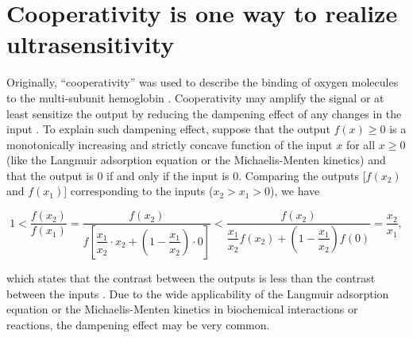 
\section{Cooperativity is one way to realize ultrasensitivity}

Originally, ``cooperativity'' was used to describe the binding of oxygen molecules to the multi-subunit hemoglobin \cite{KNF, MWC}. Cooperativity may amplify the signal or at least sensitize the output by reducing the dampening effect of any changes in the input \cite{CooperativityQA}. To explain such dampening effect, suppose that the output $f(x) \geq 0$ is a monotonically increasing and strictly concave function of the input $x$ for all $x \geq 0$ (like the Langmuir adsorption equation or the Michaelis-Menten kinetics) and that the output is 0 if and only if the input is 0. Comparing the outputs [$f(x_2)$ and $f(x_1)$] corresponding to the inputs ($x_2 > x_1 > 0$), we have

\begin{equation*}
    1 < \dfrac{f(x_2)}{f(x_1)} = \dfrac{f(x_2)}{f[\dfrac{x_1}{x_2} \cdot x_2 + (1-\dfrac{x_1}{x_2}) \cdot 0]} < \dfrac{f(x_2)}{\dfrac{x_1}{x_2}f(x_2) + (1-\dfrac{x_1}{x_2})f(0)} = \dfrac{x_2}{x_1},
\end{equation*}

\noindent which states that the contrast between the outputs is less than the contrast between the inputs \cite{InhibitorUltrasensitivity}. Due to the wide applicability of the Langmuir adsorption equation or the Michaelis-Menten kinetics in biochemical interactions or reactions, the dampening effect may be very common.

